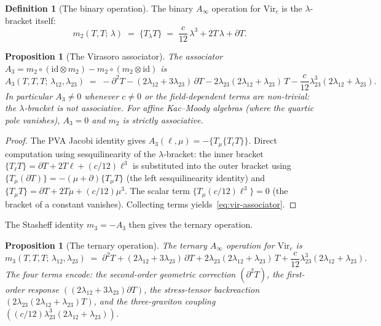 \documentclass[11pt,reqno]{amsart}
\newtheorem{proposition}[theorem]{Proposition}
\theoremstyle{definition}
\newtheorem{definition}[theorem]{Definition}
\theoremstyle{remark}
\begin{document}
\begin{definition}[The binary operation]
\label{def:vir-m2}
The binary $A_\infty$ operation for $\mathrm{Vir}_c$ is the
$\lambda$-bracket itself:
\begin{equation}\label{eq:vir-m2}
m_2(T, T;\, \lambda)
\;=\;
\{T{}_\lambda T\}
\;=\;
\frac{c}{12}\,\lambda^3
+ 2T\,\lambda
+ \partial T.
\end{equation}
\end{definition}

\begin{proposition}[The Virasoro associator]
\label{prop:vir-associator}
The associator\/ $A_3 = m_2 \circ (\mathrm{id} \otimes m_2)
- m_2 \circ (m_2 \otimes \mathrm{id})$ is
\begin{equation}\label{eq:vir-associator}
A_3(T,T,T;\,\lambda_{12},\lambda_{23})
\;=\;
-\partial^2 T
- (2\lambda_{12} + 3\lambda_{23})\,\partial T
- 2\lambda_{23}(2\lambda_{12} + \lambda_{23})\,T
- \frac{c}{12}\lambda_{23}^3(2\lambda_{12} + \lambda_{23}).
\end{equation}
In particular $A_3 \ne 0$ whenever $c \ne 0$ or the field-dependent
terms are non-trivial: the $\lambda$-bracket is not associative.
For affine Kac--Moody algebras (where the quartic pole vanishes),
$A_3 = 0$ and $m_2$ is strictly associative.
\end{proposition}

\begin{proof}
The PVA Jacobi identity gives
$A_3(\ell,\mu) = -\{T{}_\mu\{T{}_\ell T\}\}$. Direct computation
using sesquilinearity of the $\lambda$-bracket: the inner bracket
$\{T{}_\ell T\} = \partial T + 2T\ell + (c/12)\ell^3$ is
substituted into the outer bracket using $\{T{}_\mu (\partial T)\}
= -(\mu + \partial)\{T{}_\mu T\}$ (the left sesquilinearity
identity) and $\{T{}_\mu T\} = \partial T + 2T\mu + (c/12)\mu^3$.
The scalar term $\{T{}_\mu (c/12)\ell^3\} = 0$ (the bracket of a
constant vanishes). Collecting terms yields~\eqref{eq:vir-associator}.
\end{proof}

The Stasheff identity $m_3 = -A_3$ then gives the ternary operation.

\begin{proposition}[The ternary operation]
\label{prop:vir-m3}
The ternary $A_\infty$ operation for $\mathrm{Vir}_c$ is
\begin{equation}\label{eq:vir-m3}
m_3(T,T,T;\,\lambda_{12},\lambda_{23})
\;=\;
\partial^2 T
+ (2\lambda_{12} + 3\lambda_{23})\,\partial T
+ 2\lambda_{23}(2\lambda_{12} + \lambda_{23})\,T
+ \frac{c}{12}\lambda_{23}^3(2\lambda_{12} + \lambda_{23}).
\end{equation}
The four terms encode: the second-order geometric correction
$(\partial^2 T)$, the first-order response
$((2\lambda_{12}+3\lambda_{23})\partial T)$, the stress-tensor
backreaction $(2\lambda_{23}(2\lambda_{12}+\lambda_{23})T)$, and
the three-graviton coupling
$((c/12)\lambda_{23}^3(2\lambda_{12}+\lambda_{23}))$.
\end{proposition}
\end{document}
